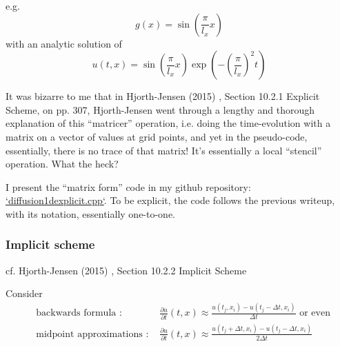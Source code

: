 \documentclass[10pt]{amsart}
\begin{document}
\begin{multicols*}{2}
e.g.
\[
g(x) = \sin{ \left( \frac{ \pi }{ l_x} x \right) }
\]
with an analytic solution of
\[
u(t,x) = \sin{ \left( \frac{\pi}{l_x}x \right) } \exp{ \left( - \left( \frac{\pi}{l_x}\right)^2 t \right) }
\]

It was bizarre to me that in Hjorth-Jensen (2015) \cite{Hjor2015}, Section 10.2.1 Explicit Scheme, on pp. 307, Hjorth-Jensen went through a lengthy and thorough explanation of this ``matricer'' operation, i.e. doing the time-evolution with a matrix on a vector of values at grid points, and yet in the pseudo-code, essentially, there is no trace of that matrix!  It's essentially a local ``stencil'' operation.  What the heck?

I present the ``matrix form'' code in my github repository: \href{https://github.com/ernestyalumni/CompPhys/blob/master/Cpp/progs/ch10pde/diffusion1dexplicit.cpp}{`diffusion1dexplicit.cpp`}.  To be explicit, the code follows the previous writeup, with its notation, essentially one-to-one.  

\subsubsection{Implicit scheme}
cf. Hjorth-Jensen (2015) \cite{Hjor2015}, Section 10.2.2 Implicit Scheme

Consider
\begin{equation}
\begin{aligned}
  & \text{ backwards formula : }       & \frac{ \partial u }{ \partial t}(t,x) \approx \frac{ u(t_j,x_i) - u(t_j-\Delta t, x_i) }{ \Delta t} \text{ or even } \\
  & \text{ midpoint approximations : } &  \frac{ \partial u }{ \partial t}(t,x) \approx \frac{ u(t_j + \Delta t,x_i) - u(t_j-\Delta t, x_i) }{ 2 \Delta t}
\end{aligned}
\end{equation}


\end{multicols*}
\end{document}

